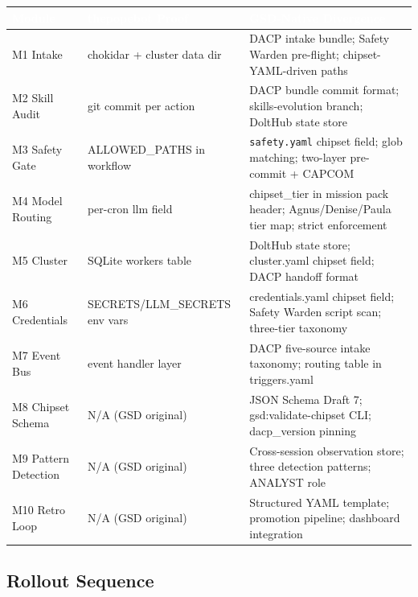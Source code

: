 \documentclass[11pt,letterpaper]{article}
\newcommand{\tableheader}[1]{\textbf{\sffamily\textcolor{white}{#1}}}
\begin{document}
\begin{center}
\begin{tabularx}{\textwidth}{L{2.5cm}L{3.5cm}X}
\toprule
{}
\tableheader{Module} & \tableheader{thepopebot Proof} & \tableheader{GSD-Native Divergence} \\
\midrule
M1 Intake & chokidar + cluster data dir & DACP intake bundle; Safety Warden pre-flight; chipset-YAML-driven paths \\
M2 Skill Audit & git commit per action & DACP bundle commit format; skills-evolution branch; DoltHub state store \\
M3 Safety Gate & ALLOWED\_PATHS in workflow & \texttt{safety.yaml} chipset field; glob matching; two-layer pre-commit + CAPCOM \\
M4 Model Routing & per-cron llm field & chipset\_tier in mission pack header; Agnus/Denise/Paula tier map; strict enforcement \\
M5 Cluster & SQLite workers table & DoltHub state store; cluster.yaml chipset field; DACP handoff format \\
M6 Credentials & SECRETS/LLM\_SECRETS env vars & credentials.yaml chipset field; Safety Warden script scan; three-tier taxonomy \\
M7 Event Bus & event handler layer & DACP five-source intake taxonomy; routing table in triggers.yaml \\
M8 Chipset Schema & N/A (GSD original) & JSON Schema Draft 7; gsd:validate-chipset CLI; dacp\_version pinning \\
M9 Pattern Detection & N/A (GSD original) & Cross-session observation store; three detection patterns; ANALYST role \\
M10 Retro Loop & N/A (GSD original) & Structured YAML template; promotion pipeline; dashboard integration \\
\end{tabularx}
\end{center}

\subsection{Rollout Sequence}
\end{document}
